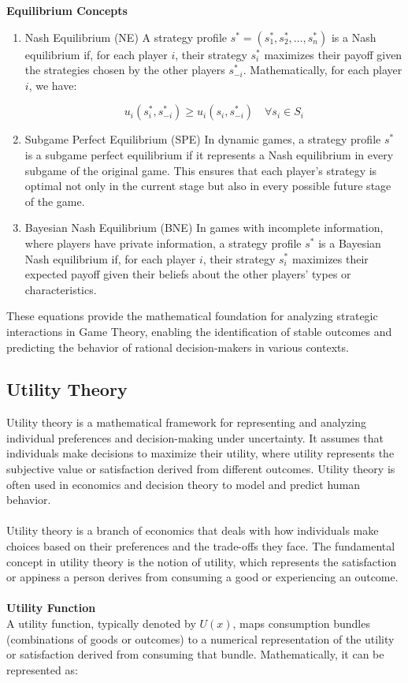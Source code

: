 \documentclass[12pt]{report}
\begin{document}
\noindent \textbf{Equilibrium Concepts}\\
\begin{enumerate}
\item Nash Equilibrium (NE)
A strategy profile \(s^* = (s_1^*, s_2^*, \ldots, s_n^*)\) is a Nash equilibrium if, for each player \(i\), their strategy \(s_i^*\) maximizes their payoff given the strategies chosen by the other players \(s_{-i}^*\). Mathematically, for each player \(i\), we have:

\begin{equation}
 u_i(s_i^*, s_{-i}^*) \geq u_i(s_i, s_{-i}^*) \quad \forall s_i \in S_i 
\end{equation}
\item Subgame Perfect Equilibrium (SPE)
In dynamic games, a strategy profile \(s^*\) is a subgame perfect equilibrium if it represents a Nash equilibrium in every subgame of the original game. This ensures that each player's strategy is optimal not only in the current stage but also in every possible future stage of the game.

\item Bayesian Nash Equilibrium (BNE)
In games with incomplete information, where players have private information, a strategy profile \(s^*\) is a Bayesian Nash equilibrium if, for each player \(i\), their strategy \(s_i^*\) maximizes their expected payoff given their beliefs about the other players' types or characteristics.
\end{enumerate}

\noindent These equations provide the mathematical foundation for analyzing strategic interactions in Game Theory, enabling the identification of stable outcomes and predicting the behavior of rational decision-makers in various contexts.

\subsection{Utility Theory}\label{ut}
Utility theory is a mathematical framework for representing and analyzing
individual preferences and decision-making under uncertainty. It assumes
that individuals make decisions to maximize their utility, where utility
represents the subjective value or satisfaction derived from different
outcomes. Utility theory is often used in economics and decision theory
to model and predict human behavior.\\
\\
Utility theory is a branch of economics that deals with how individuals make choices
based on their preferences and the trade-offs they face. The fundamental concept
in utility theory is the notion of utility, which represents the satisfaction or 
appiness a person derives from consuming a good or experiencing an outcome.\\
\\
\textbf{Utility Function}\\
A utility function, typically denoted by \( U(x) \), maps consumption bundles
(combinations of goods or outcomes) to a numerical representation of the utility or
satisfaction derived from consuming that bundle. Mathematically, it can be represented as:\\
\end{document}
